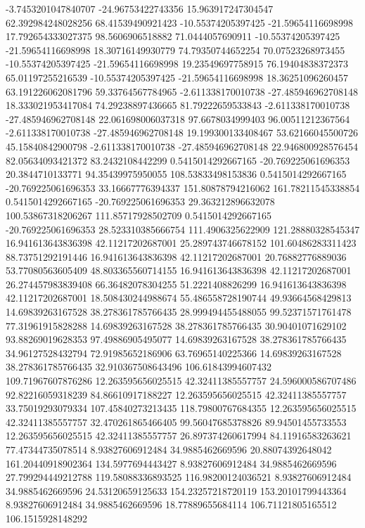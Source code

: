 -3.7453201047840707 -24.96753422743356 15.963917247304547 62.392984248028256 68.41539490921423
-10.55374205397425 -21.59654116698998 17.792654333027375 98.5606906518882 71.0444057690911
-10.55374205397425 -21.59654116698998 18.30716149930779 74.79350744652254 70.07523268973455
-10.55374205397425 -21.59654116698998 19.23549697758915 76.19404838372373 65.01197255216539
-10.55374205397425 -21.59654116698998 18.36251096260457 63.191226062081796 59.33764567784965
-2.611338170010738 -27.485946962708148 18.333021953417084 74.29238897436665 81.79222659533843
-2.611338170010738 -27.485946962708148 22.061698006037318 97.6678034999403 96.00511212367564
-2.611338170010738 -27.485946962708148 19.199300133408467 53.62166045500726 45.15840842900798
-2.611338170010738 -27.485946962708148 22.946800928576454 82.05634093421372 83.2432108442299
0.5415014292667165 -20.769225061696353 20.3844710133771 94.35439975950055 108.53833498153836
0.5415014292667165 -20.769225061696353 33.16667776394337 151.80878794216062 161.78211545338854
0.5415014292667165 -20.769225061696353 29.363212896632078 100.53867318206267 111.85717928502709
0.5415014292667165 -20.769225061696353 28.523310385666754 111.4906325622909 121.28880328545347
16.941613643836398 42.11217202687001 25.289743746678152 101.60486283311423 88.73751292191446
16.941613643836398 42.11217202687001 20.76882776889036 53.77080563605409 48.803365560714155
16.941613643836398 42.11217202687001 26.274457983839408 66.36482078304255 51.2221408826299
16.941613643836398 42.11217202687001 18.508430244988674 55.486558728190744 49.93664568429813
14.69839263167528 38.278361785766435 28.999494455488055 99.52371571761478 77.31961915828288
14.69839263167528 38.278361785766435 30.90401071629102 93.88269019628353 97.49886905495077
14.69839263167528 38.278361785766435 34.96127528432794 72.91985652186906 63.76965140225366
14.69839263167528 38.278361785766435 32.910367508643496 106.61843994607432 109.71967607876286
12.263595656025515 42.32411385557757 24.596000586707486 92.82216059318239 84.86610917188227
12.263595656025515 42.32411385557757 33.75019293079334 107.45840273213435 118.79800767684355
12.263595656025515 42.32411385557757 32.470261865466405 99.56047685378826 89.94501455733553
12.263595656025515 42.32411385557757 26.897374260617994 84.11916583263621 77.47344735078514
8.93827606912484 34.9885462669596 20.88074392648042 161.20440918902364 134.5977694443427
8.93827606912484 34.9885462669596 27.799294449212788 119.58088336893525 116.98200124036521
8.93827606912484 34.9885462669596 24.53120659125633 154.23257218720119 153.20101799443364
8.93827606912484 34.9885462669596 18.77889655684114 106.71121805165512 106.1515928148292
